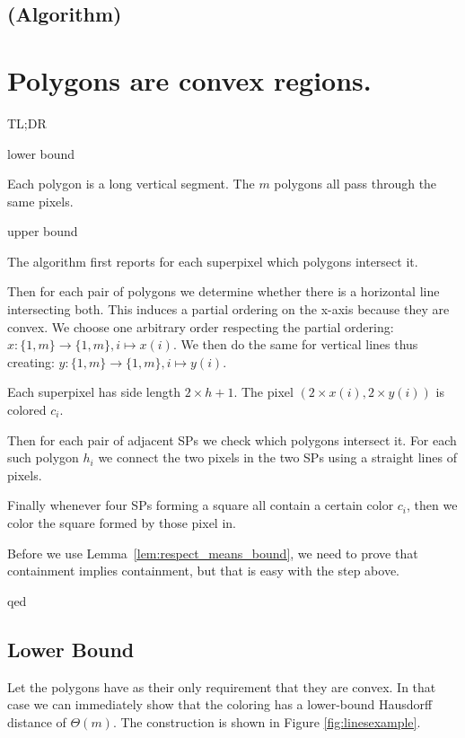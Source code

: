 \documentclass{paper}
\begin{document}
{%

\subsection{(Algorithm)}
\label{sub:fat_algo}






\section{Polygons are convex regions.}
\label{sec:convex}

TL;DR

lower bound

Each polygon is a long vertical segment. The $m$ polygons all pass through the same pixels.

upper bound

The algorithm first reports for each superpixel which  polygons intersect it.

Then for each pair of polygons we determine whether there is a horizontal line intersecting both. This induces a partial ordering on the x-axis because they are convex.
We choose one arbitrary order respecting the partial ordering: $x: \{1, m\}\to \{1, m\}, i\mapsto x(i)$.
We then do the same for vertical lines thus creating: $y: \{1, m\}\to \{1, m\}, i\mapsto y(i)$.

Each superpixel has side length $2\times h+1$. The pixel $(2\times x(i), 2\times y(i))$ is colored $c_i$.

Then for each pair of adjacent SPs we check which polygons intersect it. For each such polygon $h_i$ we connect the two pixels in the two SPs using a straight lines of pixels.

Finally whenever four SPs forming a square all contain a certain color $c_i$, then we color the square formed by those pixel in.

Before we use Lemma~\ref{lem:respect_means_bound}, we need to prove that containment implies containment, but that is easy with the step above.

qed


\subsection{Lower Bound}
\label{sub:convex_lower}

Let the polygons have as their only requirement that they are convex. In that case we can immediately show that the coloring has a lower-bound Hausdorff distance of $\Theta(m)$. The construction is shown in Figure \ref{fig:linesexample}.

}
\end{document}
